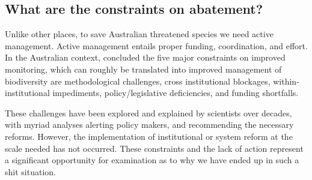 \documentclass[a4paper,11pt]{article}
\begin{document}


\subsection{What are the constraints on abatement?}

Unlike other places, to save Australian threatened species we need active management. Active management entails proper funding, coordination, and effort. In the Australian context, \cite{leggeMonitoringThreatenedSpecies2018} concluded the five major constraints on improved monitoring, which can roughly be translated into improved management of biodiversity are methodological challenges, cross institutional blockages, within-institutional impediments, policy/legislative deficiencies, and funding shortfalls. 

These challenges have been explored and explained by scientists over decades, with myriad analyses alerting policy makers, and recommending the necessary reforms. However, the implementation of institutional or system reform at the scale needed has not occurred. These constraints and the lack of action represent a significant opportunity for examination as to why we have ended up in such a shit situation.
\end{document}
